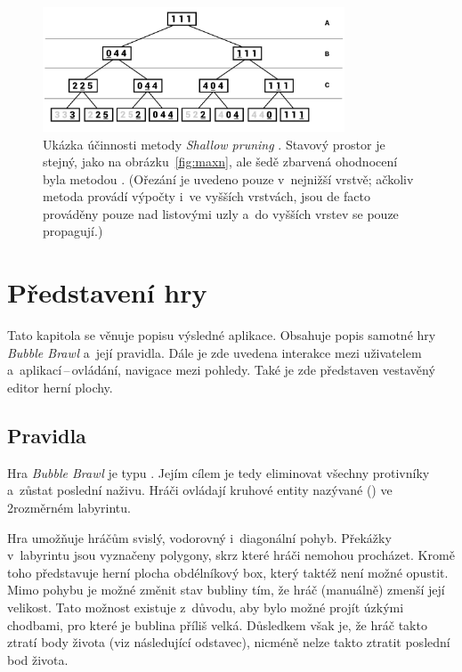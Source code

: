\begin{figure}[ht]
    \centering
    \includegraphics[width=0.8\textwidth]{doc/obrazky-figures/maxn-shallow-pruning.pdf}
    \caption{Ukázka účinnosti metody \emph{Shallow pruning} \cite{Maxn}. Stavový prostor je stejný, jako na obrázku~\ref{fig:maxn}, ale šedě zbarvená ohodnocení byla metodou . (Ořezání je uvedeno pouze v~nejnižší vrstvě; ačkoliv metoda provádí výpočty i~ve vyšších vrstvách, jsou de facto prováděny pouze nad listovými uzly a~do vyšších vrstev se pouze propagují.)}
    \label{fig:maxn-shallow-pruning}
\end{figure}


\chapter{Představení hry}
\label{ch:predstaveni-hry}

Tato kapitola se věnuje popisu výsledné aplikace. Obsahuje popis samotné hry \emph{Bubble Brawl} a~její pravidla. Dále je zde uvedena interakce mezi uživatelem a~aplikací\,--\,ovládání, navigace mezi pohledy. Také je zde představen vestavěný editor herní plochy.

\section{Pravidla}

Hra \emph{Bubble Brawl} je typu . Jejím cílem je tedy eliminovat všechny protivníky a~zůstat poslední naživu. Hráči ovládají kruhové entity nazývané  () ve 2rozměrném labyrintu. 

Hra umožňuje hráčům svislý, vodorovný i~diagonální pohyb. Překážky v~labyrintu jsou vyznačeny polygony, skrz které hráči nemohou procházet. Kromě toho představuje herní plocha obdélníkový box, který taktéž není možné opustit. Mimo pohybu je možné změnit stav bubliny tím, že hráč (manuálně) zmenší její velikost. Tato možnost existuje z~důvodu, aby bylo možné projít úzkými chodbami, pro které je bublina příliš velká. Důsledkem však je, že hráč takto ztratí body života (viz následující odstavec), nicméně nelze takto ztratit poslední bod života.

